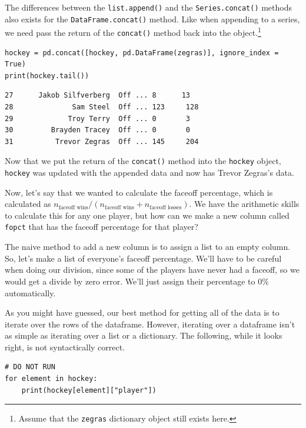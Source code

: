 The differences between the \verb|list.append()| and the \verb|Series.concat()| methods also exists for the \verb|DataFrame.concat()| method. Like when appending to a series, we need pass the return of the \verb|concat()| method back into the object.\cprotect\footnote{Assume that the \verb|zegras| dictionary object still exists here.}\par
\begin{lstlisting}[style=pippython]
hockey = pd.concat([hockey, pd.DataFrame(zegras)], ignore_index = True)
print(hockey.tail())
\end{lstlisting}
\begin{lstlisting}[style=none]
27      Jakob Silfverberg  Off ... 8      13
28              Sam Steel  Off ... 123     128
29             Troy Terry  Off ... 0       3
30         Brayden Tracey  Off ... 0       0
31          Trevor Zegras  Off ... 145     204
\end{lstlisting}
Now that we put the return of the \verb|concat()| method into the \verb|hockey| object, \verb|hockey| was updated with the appended data and now has Trevor Zegras's data.\par
Now, let's say that we wanted to calculate the faceoff percentage, which is calculated as $n_\text{faceoff wins}/(n_\text{faceoff wins} + n_\text{faceoff losses})$. We have the arithmetic skills to calculate this for any one player, but how can we make a new column called \verb|fopct| that has the faceoff percentage for that player?\par
The naive method to add a new column is to assign a list to an empty column. So, let's make a list of everyone's faceoff percentage. We'll have to be careful when doing our division, since some of the players have never had a faceoff, so we would get a divide by zero error. We'll just assign their percentage to 0\% automatically.\par
As you might have guessed, our best method for getting all of the data is to iterate over the rows of the dataframe. However, iterating over a dataframe isn't as simple as iterating over a list or a dictionary. The following, while it looks right, is not syntactically correct.\par
\begin{lstlisting}[style=pippython]
# DO NOT RUN
for element in hockey:
	print(hockey[element]["player"])
\end{lstlisting}
